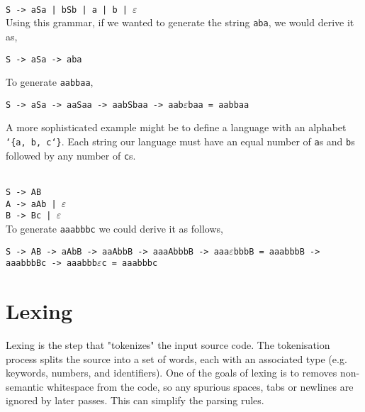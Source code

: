 \documentclass{book}
\newcommand{\Scribtexttt}[1]{{\texttt{#1}}}
\newcommand{\Stttextmore}{{\fontencoding{T1}\selectfont>}}
\newcommand{\Stttextbar}{{\fontencoding{T1}\selectfont|}}
\let\SOriginalthesubsubsection\thesubsubsection
\newcommand{\Ssubsection}[2]{\subsection[#1]{#2}\let\thesubsubsection\SOriginalthesubsubsection}
\renewcommand{\Ssubsection}[2]{\section[#1]{#2}}
\begin{document}
\hspace*{\fill}\\\Scribtexttt{S {-}{\Stttextmore} aSa {\Stttextbar} bSb {\Stttextbar} a {\Stttextbar} b {\Stttextbar} $\varepsilon$}\hspace*{\fill}\\

Using this grammar, if we wanted to generate the string \Scribtexttt{aba}, we would
derive it as,

\Scribtexttt{S {-}{\Stttextmore} aSa {-}{\Stttextmore} aba}

To generate \Scribtexttt{aabbaa},

\Scribtexttt{S {-}{\Stttextmore} aSa {-}{\Stttextmore} aaSaa {-}{\Stttextmore} aabSbaa {-}{\Stttextmore} aab$\varepsilon$baa = aabbaa}

A more sophisticated example might be to define a language with an
alphabet \Scribtexttt{{\char`\{}a, b, c{\char`\}}}. Each string our language must have an equal
number of \Scribtexttt{a}s and \Scribtexttt{b}s followed by any number of \Scribtexttt{c}s.

\hspace*{\fill}\\\Scribtexttt{S {-}{\Stttextmore} AB}\hspace*{\fill}\\\Scribtexttt{A {-}{\Stttextmore} aAb {\Stttextbar} $\varepsilon$}\hspace*{\fill}\\\Scribtexttt{B {-}{\Stttextmore} Bc {\Stttextbar} $\varepsilon$}\hspace*{\fill}\\

To generate \Scribtexttt{aaabbbc} we could derive it as follows,

\Scribtexttt{S {-}{\Stttextmore} AB {-}{\Stttextmore} aAbB {-}{\Stttextmore} aaAbbB {-}{\Stttextmore} aaaAbbbB {-}{\Stttextmore} aaa$\varepsilon$bbbB = aaabbbB {-}{\Stttextmore} aaabbbBc {-}{\Stttextmore} aaabbb$\varepsilon$c = aaabbbc}

\Ssubsection{Lexing}{Lexing}\label{t:x28part_x22Lexingx22x29}

Lexing is the step that "tokenizes" the input source code. The
tokenisation process splits the source into a set of words, each with an
associated type (e.g. keywords, numbers, and identifiers). One of the goals
of lexing is to removes non{-}semantic whitespace from the code, so any
spurious spaces, tabs or newlines are ignored by later passes. This can
simplify the parsing rules.
\end{document}
